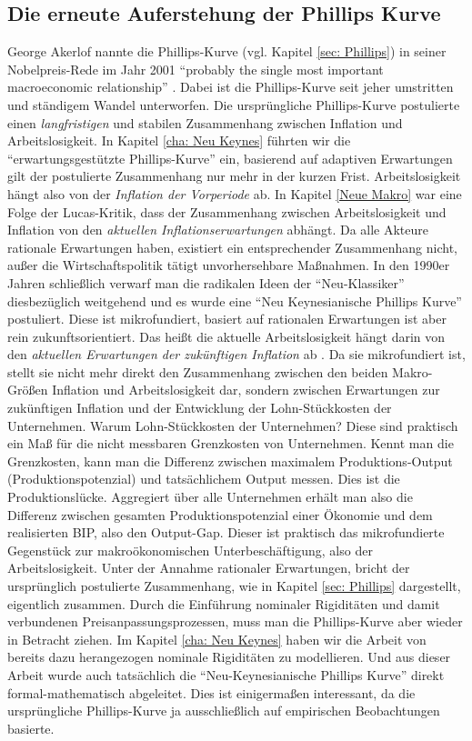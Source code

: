 \subsection{Die erneute Auferstehung der Phillips Kurve}
\label{NeuePhillips}
George Akerlof nannte die Phillips-Kurve (vgl. Kapitel \ref{sec: Phillips}) in seiner Nobelpreis-Rede im Jahr 2001 "`probably the single most important macroeconomic relationship"' \parencite{Nobelpreis-Komitee2001}. Dabei ist die Phillips-Kurve seit jeher umstritten und ständigem Wandel unterworfen. Die ursprüngliche Phillips-Kurve postulierte einen \textit{langfristigen} und stabilen Zusammenhang zwischen Inflation und Arbeitslosigkeit. In Kapitel \ref{cha: Neu Keynes} führten wir die "`erwartungsgestützte Phillips-Kurve"' ein, basierend auf adaptiven Erwartungen gilt der postulierte Zusammenhang nur mehr in der kurzen Frist. Arbeitslosigkeit hängt also von der \textit{Inflation der Vorperiode} ab. In Kapitel \ref{Neue Makro} war eine Folge der Lucas-Kritik, dass der Zusammenhang zwischen Arbeitslosigkeit und Inflation von den \textit{aktuellen Inflationserwartungen} abhängt. Da alle Akteure rationale Erwartungen haben, existiert ein entsprechender Zusammenhang nicht, außer die Wirtschaftspolitik tätigt unvorhersehbare Maßnahmen. In den 1990er Jahren schließlich verwarf man die radikalen Ideen der "`Neu-Klassiker"' diesbezüglich weitgehend und es wurde eine "`Neu Keynesianische Phillips Kurve"' postuliert. Diese ist mikrofundiert, basiert auf rationalen Erwartungen ist aber rein zukunftsorientiert. Das heißt die aktuelle Arbeitslosigkeit hängt darin von den \textit{aktuellen Erwartungen der zukünftigen Inflation} ab \parencite[S. 980]{Roberts1995}. Da sie mikrofundiert ist, stellt sie nicht mehr direkt den Zusammenhang zwischen den beiden Makro-Größen Inflation und Arbeitslosigkeit dar, sondern zwischen Erwartungen zur zukünftigen Inflation und der Entwicklung der Lohn-Stückkosten der Unternehmen. Warum Lohn-Stückkosten der Unternehmen? Diese sind praktisch ein Maß für die nicht messbaren Grenzkosten von Unternehmen. Kennt man die Grenzkosten, kann man die Differenz zwischen maximalem Produktions-Output (Produktionspotenzial) und tatsächlichem Output messen. Dies ist die Produktionslücke. Aggregiert über alle Unternehmen erhält man also die Differenz zwischen gesamten Produktionspotenzial einer Ökonomie und dem realisierten BIP, also den Output-Gap. Dieser ist praktisch das mikrofundierte Gegenstück zur makroökonomischen Unterbeschäftigung, also der Arbeitslosigkeit. Unter der Annahme rationaler Erwartungen, bricht der ursprünglich postulierte Zusammenhang, wie in Kapitel \ref{sec: Phillips} dargestellt, eigentlich zusammen. Durch die Einführung nominaler Rigiditäten und damit verbundenen Preisanpassungsprozessen, muss man die Phillips-Kurve aber wieder in Betracht ziehen. Im Kapitel \ref{cha: Neu Keynes} haben wir die Arbeit von \textcite{Calvo1983} bereits dazu herangezogen nominale Rigiditäten zu modellieren. Und aus dieser Arbeit wurde auch tatsächlich die "`Neu-Keynesianische Phillips Kurve"' direkt formal-mathematisch abgeleitet. Dies ist einigermaßen interessant, da die ursprüngliche Phillips-Kurve ja ausschließlich auf empirischen Beobachtungen basierte.

